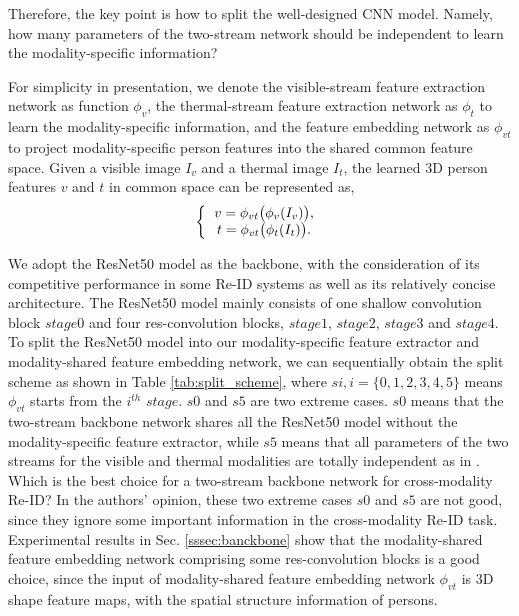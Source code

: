 \documentclass[journal]{IEEEtran}
\begin{document}
Therefore, the key point is how to split the well-designed CNN model. Namely, how many parameters of the two-stream network should be independent to learn the modality-specific information?

For simplicity in presentation, we denote the visible-stream feature extraction network as function $\phi_{v}$, the thermal-stream feature extraction network as $\phi_{t}$ to learn the modality-specific information, and the feature embedding network as $\phi_{vt}$ to project modality-specific person features into the shared common feature space.
Given a visible image $I_{v}$ and a thermal image $I_{t}$, the learned 3D person features $v$ and $t$ in common space can be represented as,
\begin{align}
\left\{
    \begin{tabular}{cl}
    $v = \phi_{vt}\big( \phi_{v}(I_{v}) \big)$,\\
    $t = \phi_{vt}\big( \phi_{t}(I_{t}) \big)$.
    \end{tabular}
    \right.
\end{align}


We adopt the ResNet50 model as the backbone, with the consideration of its competitive performance in some Re-ID systems as well as its relatively concise architecture. The ResNet50 model mainly consists of one shallow convolution block $stage0$ and four res-convolution blocks, $stage1$, $stage2$, $stage3$ and $stage4$.
To split the ResNet50 model into our modality-specific feature extractor and modality-shared feature embedding network, we can sequentially obtain the split scheme as shown in Table \ref{tab:split_scheme}, where $si, i=\{0,1,2,3,4,5\}$ means $\phi_{vt}$ starts from the $i^{th}$ $stage$. $s0$ and $s5$ are two extreme cases. $s0$ means that the two-stream backbone network shares all the ResNet50 model without the modality-specific feature extractor, while $s5$ means that all parameters of the two streams for the visible and thermal modalities are totally independent as in \cite{ye2018visible}.
Which is the best choice for a two-stream backbone network for cross-modality Re-ID? In the authors' opinion, these two extreme cases $s0$ and $s5$ are not good, since they ignore some important information in the cross-modality Re-ID task. Experimental results in Sec. \ref{sssec:banckbone} show that the modality-shared feature embedding network comprising some res-convolution blocks is a good choice, since the input of modality-shared feature embedding network $\phi_{vt}$ is 3D shape feature maps, with the spatial structure information of persons.
\end{document}
